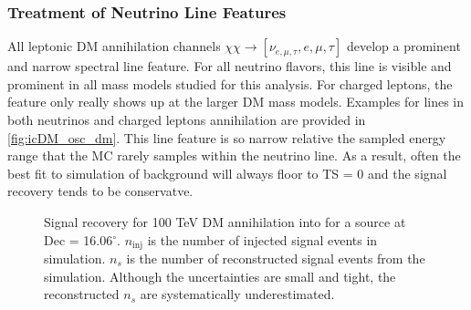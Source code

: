 \subsubsection{Treatment of Neutrino Line Features}\label{sec:icDM_nu_lines}

All leptonic DM annihilation channels $ \chi\chi \rightarrow [\nu_{e, \mu, \tau}, e, \mu,\tau] $ develop a prominent and narrow spectral line feature.
For all neutrino flavors, this line is visible and prominent in all mass models studied for this analysis.
For charged leptons, the feature only really shows up at the larger DM mass models.
Examples for lines in both neutrinos and charged leptons annihilation are provided in \cref{fig:icDM_osc_dm}.
This line feature is so narrow relative the sampled energy range that the MC rarely samples within the neutrino line.
As a result, often the best fit to simulation of background will always floor to TS = 0 and the signal recovery tends to be conservatve.

\begin{figure}[t]
    \caption{Signal recovery for 100 TeV DM annihilation into \parpar{\nu_\mu} for a source at Dec = 16.06$^\circ$. $n_\mathrm{inj}$ is the number of injected signal events in simulation. $n_s$ is the number of reconstructed signal events from the simulation. Although the uncertainties are small and tight, the reconstructed $ n_s $ are systematically underestimated.} \label{fig:sig_recovery_fail}
\end{figure}


